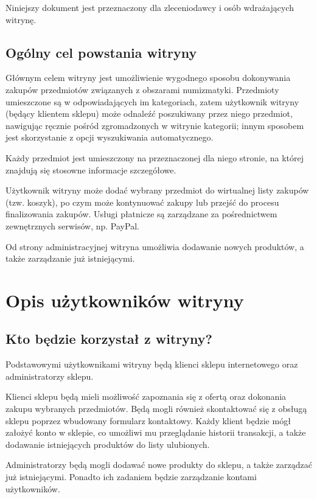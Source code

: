 \documentclass 	[11pt, a4paper, leqno]	{article}					%
\begin{document}
Niniejszy dokument jest przeznaczony dla zleceniodawcy i osób wdrażających witrynę.

\subsection{Ogólny cel powstania witryny}
\noindent
Głównym celem witryny jest umożliwienie wygodnego sposobu dokonywania zakupów przedmiotów związanych z obszarami numizmatyki. Przedmioty umieszczone są w odpowiadających im kategoriach, zatem użytkownik witryny (będący klientem sklepu) może odnaleźć poszukiwany przez niego przedmiot, nawigując ręcznie pośród zgromadzonych w witrynie kategorii; innym sposobem jest skorzystanie z opcji wyszukiwania automatycznego. 

Każdy przedmiot jest umieszczony na przeznaczonej dla niego stronie, na której znajdują się stosowne informacje szczegółowe. 

Użytkownik witryny może dodać wybrany przedmiot do wirtualnej listy zakupów (tzw. koszyk), po czym może kontynuować zakupy lub przejść do procesu finalizowania zakupów. Usługi płatnicze są zarządzane za pośrednictwem zewnętrznych serwisów, np. PayPal. 

Od strony administracyjnej witryna umożliwia dodawanie nowych produktów, a także zarządzanie już istniejącymi.

\section{Opis użytkowników witryny}

\subsection{Kto będzie korzystał z witryny?}
\noindent
Podstawowymi użytkownikami witryny będą klienci sklepu internetowego oraz administratorzy sklepu. 

Klienci sklepu będą mieli możliwość zapoznania się z ofertą oraz dokonania zakupu wybranych przedmiotów. Będą mogli również skontaktować się z obsługą sklepu poprzez wbudowany formularz kontaktowy. Każdy klient będzie mógł założyć konto w sklepie, co umożliwi mu przeglądanie historii transakcji, a także dodawanie istniejących produktów do listy ulubionych.

Administratorzy będą mogli dodawać nowe produkty do sklepu, a także zarządzać już istniejącymi. Ponadto ich zadaniem będzie zarządzanie kontami użytkowników.  
\end{document}
